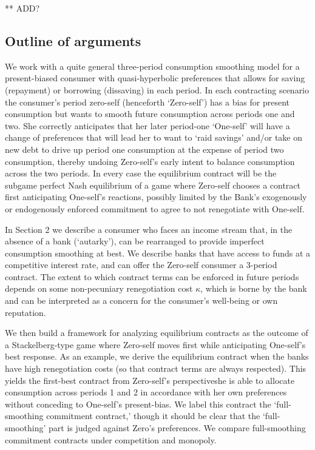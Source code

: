\documentclass[11pt,english]{article}
\theoremstyle{plain}
\theoremstyle{definition}
\begin{document}
 **
ADD?


\subsection{Outline of arguments}

We work with a quite general three-period consumption smoothing model for a present-biased consumer with quasi-hyperbolic preferences that allows for saving (repayment) or borrowing (dissaving) in each period. In each contracting
scenario the consumer's period zero-self (henceforth `Zero-self')
has a bias for present consumption but wants to smooth future consumption
across periods one and two. She correctly anticipates that her later
period-one `One-self' will have a change of preferences that will
lead her to want to `raid savings' and/or take on new debt to drive
up period one consumption at the expense of period two consumption,
thereby undoing Zero-self's early intent to balance consumption across
the two periods. In every case the equilibrium contract will be the
subgame perfect Nash equilibrium of a game where Zero-self chooses
a contract first anticipating One-self's reactions, possibly limited
by the Bank's exogenously or endogenously enforced commitment to agree
to not renegotiate with One-self. 


In Section 2 we describe a consumer who faces an income stream that,
in the absence of a bank (`autarky'), can be rearranged to provide
imperfect consumption smoothing at best. We describe banks that have
access to funds at a competitive interest rate, and can offer the
Zero-self consumer a 3-period contract. The extent to which contract
terms can be enforced in future periods depends on some non-pecuniary
renegotiation cost $\kappa$, which is borne by the bank and can be
interpreted as a concern for the consumer's well-being or own reputation.

We then build a framework for analyzing equilibrium contracts as the
outcome of a Stackelberg-type game where Zero-self moves first while
anticipating One-self's best response. As an example, we derive the
equilibrium contract when the banks have high
renegotiation costs (so that contract terms are always respected).
This yields the first-best contract from Zero-self's perspective\textendash she
is able to allocate consumption across periods 1 and 2 in accordance
with her own preferences without conceding to One-self's present-bias.
We label this contract the `full-smoothing commitment contract,' though
it should be clear that the `full-smoothing' part is judged against
Zero's preferences. We compare full-smoothing commitment contracts
under competition and monopoly.
\end{document}
